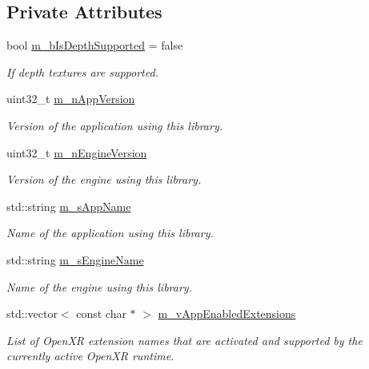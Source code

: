 \subsection*{Private Attributes}
\begin{DoxyCompactItemize}
\item 
bool \mbox{\hyperlink{class_open_x_r_provider_1_1_x_r_core_a68aaefb616672a47a05370fc9bed91f0}{m\+\_\+b\+Is\+Depth\+Supported}} = false
\begin{DoxyCompactList}\small\item\em If depth textures are supported. \end{DoxyCompactList}\item 
uint32\+\_\+t \mbox{\hyperlink{class_open_x_r_provider_1_1_x_r_core_abcfb5ecc22e4375056c60d1a5e9f48d4}{m\+\_\+n\+App\+Version}}
\begin{DoxyCompactList}\small\item\em Version of the application using this library. \end{DoxyCompactList}\item 
uint32\+\_\+t \mbox{\hyperlink{class_open_x_r_provider_1_1_x_r_core_ae14f037986973f0fbc0fa86c2806ea2b}{m\+\_\+n\+Engine\+Version}}
\begin{DoxyCompactList}\small\item\em Version of the engine using this library. \end{DoxyCompactList}\item 
std\+::string \mbox{\hyperlink{class_open_x_r_provider_1_1_x_r_core_a486c80ff8007108fb6d37c43377f965d}{m\+\_\+s\+App\+Name}}
\begin{DoxyCompactList}\small\item\em Name of the application using this library. \end{DoxyCompactList}\item 
std\+::string \mbox{\hyperlink{class_open_x_r_provider_1_1_x_r_core_a9c9e4cbacab3f30b732f159576fc130d}{m\+\_\+s\+Engine\+Name}}
\begin{DoxyCompactList}\small\item\em Name of the engine using this library. \end{DoxyCompactList}\item 
std\+::vector$<$ const char $\ast$ $>$ \mbox{\hyperlink{class_open_x_r_provider_1_1_x_r_core_a527e151ea9a2a90db55d61e4358c9f78}{m\+\_\+v\+App\+Enabled\+Extensions}}
\begin{DoxyCompactList}\small\item\em List of Open\+XR extension names that are activated and supported by the currently active Open\+XR runtime. \end{DoxyCompactList}\item 

\end{DoxyCompactItemize}
